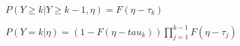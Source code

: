 $P(Y \geq k | Y \geq k-1, \eta) = F(\eta - \tau_{k})$

$P(Y=k | \eta) = (1-F(\eta-tau_{k})) \prod_{j=1}^{k-1} F(\eta-\tau_{j})$


%



